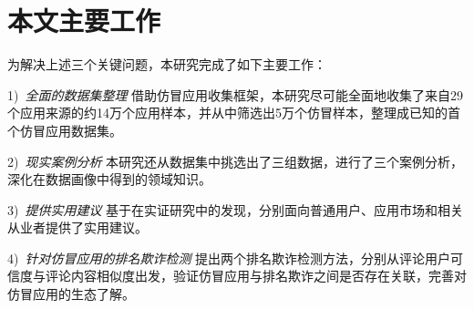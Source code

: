 \section{本文主要工作}
为解决上述三个关键问题，本研究完成了如下主要工作：

1)\	\emph{全面的数据集整理} \quad
借助仿冒应用收集框架\mytool，本研究尽可能全面地收集了来自29个应用来源的约14万个应用样本，并从中筛选出5万个仿冒样本，整理成已知的首个仿冒应用数据集。

2)\ \emph{现实案例分析} \quad
本研究还从数据集中挑选出了三组数据，进行了三个案例分析，深化在数据画像中得到的领域知识。

3)\ \emph{提供实用建议} \quad
基于在实证研究中的发现，分别面向普通用户、应用市场和相关从业者提供了实用建议。

4)\ \emph{针对仿冒应用的排名欺诈检测} \quad
提出两个排名欺诈检测方法，分别从评论用户可信度与评论内容相似度出发，验证仿冒应用与排名欺诈之间是否存在关联，完善对仿冒应用的生态了解。


